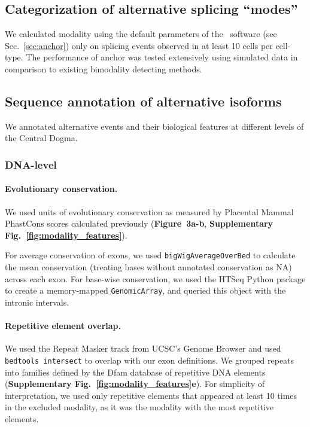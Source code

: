 \subsection{Categorization of alternative splicing ``modes''}
We calculated modality using the default parameters of the \anchor\, software (see Sec.~\ref{sec:anchor}) only on splicing events observed in at least 10 cells per cell-type. The performance of anchor was tested extensively using simulated data in comparison to existing bimodality detecting methods.

\subsection{Sequence annotation of alternative isoforms}

We annotated alternative events and their biological features at different levels of the Central Dogma.

\subsubsection{DNA-level}

\paragraph{Evolutionary conservation.} We used units of evolutionary conservation as measured by Placental Mammal PhastCons\cite{Siepel:2005cu} scores calculated previously\cite{Lovci:2013cq} (\textbf{Figure~3a-b}, \textbf{Supplementary Fig.~\ref{fig:modality_features}}). 

For average conservation of exons, we used \texttt{bigWigAverageOverBed}\cite{Kent:2010ff} to calculate the mean conservation (treating bases without annotated conservation as NA) across each exon. For base-wise conservation, we used the HTSeq\cite{Anders:2015gf} Python package to create a memory-mapped \texttt{GenomicArray}, and queried this object with the intronic intervals.


\paragraph{Repetitive element overlap.} We used the Repeat Masker track\cite{Rosenbloom:2015bg} from UCSC's Genome Browser\cite{Kent:2002bwa} and used \texttt{bedtools intersect}\cite{Quinlan:2010kma} to overlap with our exon definitions. We grouped repeats into families defined by the Dfam\cite{Hubley:2016fu} database of repetitive DNA elements (\textbf{Supplementary Fig.~\ref{fig:modality_features}e}). For simplicity of interpretation, we used only repetitive elements that appeared at least 10 times in the excluded modality, as it was the modality with the most repetitive elements.

